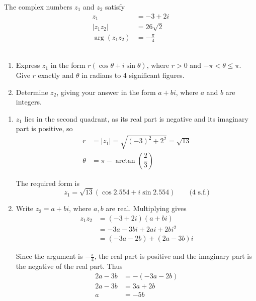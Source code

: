 \documentclass[leqno]{article}
\begin{document}
\begin{enumerate}[
  label=\textbf{\arabic*.},
  leftmargin=*,
  topsep=0pt,
  partopsep=0pt,
  parsep=0pt
]
\newpage

\questionitem

The complex numbers $z_1$ and $z_2$ satisfy
\[
\begin{aligned}
z_1 &= -3+2i \\
|z_1z_2| &= 26\sqrt{2} \\
\arg(z_1z_2) &= -\frac{\pi}{4}
\end{aligned}
\] \\
\begin{enumerate}[label=\textbf{(\alph*)}]
\item Express $z_1$ in the form $r(\cos\theta+i\sin\theta)$, where $r>0$ and $-\pi<\theta\leq\pi$. \\
Give $r$ exactly and $\theta$ in radians to 4 significant figures.  \\
\item Determine $z_2$, giving your answer in the form $a+bi$, where $a$ and $b$ are integers.  \\
\end{enumerate}

\vspace*{10pt}

\begin{djsSolution}
\begin{enumerate}[label=\textbf{(\alph*)}, start=1]
\item \(z_1\) lies in the second quadrant, as its real part is negative and its imaginary part is positive, so
\begin{align*}
r&=|z_1|=\sqrt{(-3)^2+2^2}=\sqrt{13}\\
\theta&=\pi-\arctan\left(\dfrac{2}{3}\right)
\end{align*}

The required form is
\[
z_1=\sqrt{13}\left(\cos 2.554+i\sin 2.554\right)\qquad\text{(4 s.f.)}
\]

\item Write \(z_2=a+bi\), where \(a,b\) are real. Multiplying gives
\begin{align*}
z_1z_2&=(-3+2i)(a+bi)\\
&=-3a-3bi+2ai+2bi^2\\
&=(-3a-2b)+(2a-3b)i
\end{align*}

Since the argument is \(-\frac{\pi}{4}\), the real part is positive and the imaginary part is the negative of the real part. Thus
\begin{align*}
2a-3b&=-(-3a-2b)\\
2a-3b&=3a+2b\\
a&=-5b
\end{align*}


\end{enumerate}
\end{djsSolution}
\end{enumerate}
\end{document}
